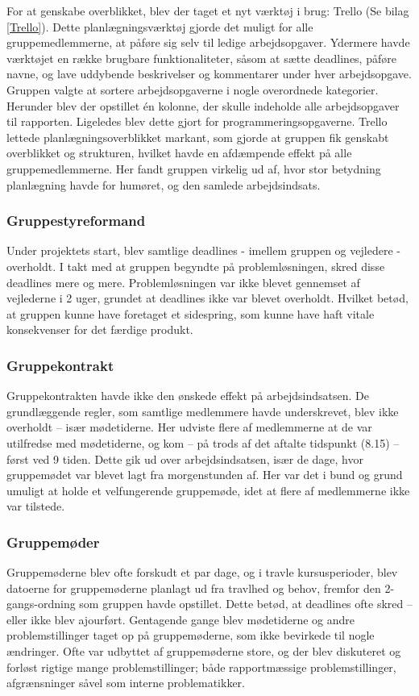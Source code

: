 For at genskabe overblikket, blev der taget et nyt værktøj i brug: Trello (Se bilag \ref{Trello}). Dette planlægningsværktøj gjorde det muligt for alle gruppemedlemmerne, at påføre sig selv til ledige arbejdsopgaver. Ydermere havde værktøjet en række brugbare funktionaliteter, såsom at sætte deadlines, påføre navne, og lave uddybende beskrivelser og kommentarer under hver arbejdsopgave.
Gruppen valgte at sortere arbejdsopgaverne i nogle overordnede kategorier. Herunder blev der opstillet én kolonne, der skulle indeholde alle arbejdsopgaver til rapporten. Ligeledes blev dette gjort for programmeringsopgaverne. Trello lettede planlægningsoverblikket markant, som gjorde at gruppen fik genskabt overblikket og strukturen, hvilket havde en afdæmpende effekt på alle gruppemedlemmerne. Her fandt gruppen virkelig ud af, hvor stor betydning planlægning havde for humøret, og den samlede arbejdsindsats. \\ 

\subsubsection{Gruppestyreformand}
Under projektets start, blev samtlige deadlines - imellem gruppen og vejledere - overholdt. I takt med at gruppen begyndte på problemløsningen, skred disse deadlines mere og mere. Problemløsningen var ikke blevet gennemset af vejlederne i 2 uger, grundet at deadlines ikke var blevet overholdt. Hvilket betød, at gruppen kunne have foretaget et sidespring, som kunne have haft vitale konsekvenser for det færdige produkt. \\

\subsubsection{Gruppekontrakt}
Gruppekontrakten havde ikke den ønskede effekt på arbejdsindsatsen. De grundlæggende regler, som samtlige medlemmere havde underskrevet, blev ikke overholdt – især mødetiderne. Her udviste flere af medlemmerne at de var utilfredse med mødetiderne, og kom – på trods af det aftalte tidspunkt (8.15) – først ved 9 tiden. Dette gik ud over arbejdsindsatsen, især de dage, hvor gruppemødet var blevet lagt fra morgenstunden af. Her var det i bund og grund umuligt at holde et velfungerende gruppemøde, idet at flere af medlemmerne ikke var tilstede. \\

\subsubsection{Gruppemøder}
Gruppemøderne blev ofte forskudt et par dage, og i travle kursusperioder, blev datoerne for gruppemøderne planlagt ud fra travlhed og behov, fremfor den 2-gangs-ordning som gruppen havde opstillet. Dette betød, at deadlines ofte skred – eller ikke blev ajourført. Gentagende gange blev mødetiderne og andre problemstillinger taget op på gruppemøderne, som ikke bevirkede til nogle ændringer. Ofte var udbyttet af gruppemøderne store, og der blev diskuteret og forløst rigtige mange problemstillinger; både rapportmæssige problemstillinger, afgrænsninger såvel som interne problematikker. \\

